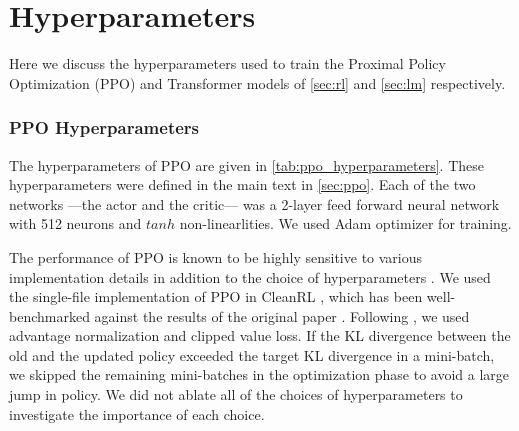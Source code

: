 
\section{Hyperparameters}\label{app:hyperparameters}

Here we discuss the hyperparameters used to train the Proximal Policy Optimization (PPO) and Transformer models of \cref{sec:rl} and \cref{sec:lm} respectively.

\subsubsection*{PPO Hyperparameters} 
The hyperparameters of PPO are given in \cref{tab:ppo_hyperparameters}. These hyperparameters were defined in the main text in \cref{sec:ppo}. Each of the two networks ---the actor and the critic--- was a 2-layer feed forward neural network with 512 neurons and $tanh$ non-linearlities. We used Adam optimizer for training.


The performance of PPO is known to be highly sensitive to various implementation details in addition to the choice of hyperparameters \cite{shengyi2022the37implementation, engstrom2020implementation}. We used the single-file implementation of PPO in CleanRL \cite{huang2022cleanrl}, which has been well-benchmarked against the results of the original paper \cite{schulman2017proximal}. Following \cite{engstrom2020implementation}, we used advantage normalization and clipped value loss. If the KL divergence between the old and the updated policy exceeded the target KL divergence in a mini-batch, we skipped the remaining mini-batches in the optimization phase to avoid a large jump in policy.
We did not ablate all of the choices of hyperparameters to investigate the importance of each choice.

